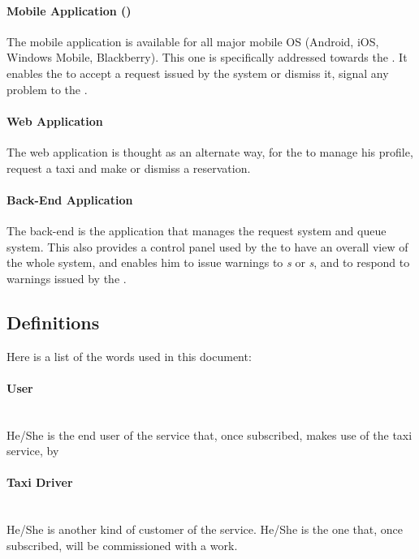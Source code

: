 \paragraph{Mobile Application (\emph{})} %
  \label{app:mobiledriver}
  The mobile application is available for all major mobile OS (Android, iOS, Windows Mobile, Blackberry).
  This one is specifically addressed towards the \emph{}.
  It enables the \emph{} to accept a request issued by the system or dismiss it, signal any problem to the \emph{}.

\paragraph{Web Application} %
  \label{app:web}
  The web application is thought as an alternate way, for the \emph{} to manage his profile, request a taxi and make or dismiss a reservation.

\paragraph{Back-End Application} %
  \label{app:backend}
  The back-end is the application that manages the request system and queue system. This also provides a control panel used by the \emph{} to have an overall view of the whole system, and enables him to issue warnings to \emph{s} or \emph{s}, and to respond to warnings issued by the \emph{}.
\subsection{Definitions}
\label{sub:def}
Here is a list of the words used in this document:

\paragraph{User} \hfill \\
\label{def:user} He/She is the end user of the service that, once subscribed, makes use of the taxi service, by 

\paragraph{Taxi Driver} \hfill \\
\label{def:taxidriver} He/She is another kind of customer of the service. He/She is the one that, once subscribed, will be commissioned with a work.

